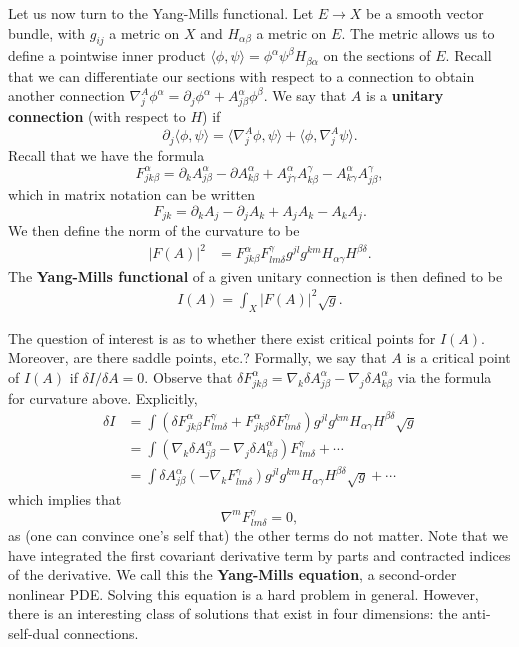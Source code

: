 \documentclass{../mathnotes}
\begin{document}
Let us now turn to the Yang-Mills functional. Let $E\to X$ be a smooth vector bundle, with $g_{ij}$ a metric on $X$
and $H_{\alpha\beta}$ a metric on $E$. 
The metric allows us to define a pointwise inner product $\langle\phi,\psi\rangle=\phi^\alpha\psi^\beta H_{\beta\alpha}$
on the sections of $E$. Recall that we can differentiate our sections with respect to a connection to obtain another connection
$\nabla^A_j\phi^\alpha=\partial_j\phi^\alpha+A_{j\beta}^\alpha\phi^\beta$. We say that $A$ is a \textbf{unitary connection}
(with respect to $H$) if
\[\partial_j\langle\phi,\psi\rangle=\langle\nabla_j^A\phi,\psi\rangle+\langle\phi,\nabla^A_j\psi\rangle.\]
Recall that we have the formula
\[F_{jk\beta}^\alpha=\partial_k A^\alpha_{j\beta}-\partial A^\alpha_{k\beta}+A^\alpha_{j\gamma}A^\gamma_{k\beta}-A^\alpha_{k\gamma}A^\gamma_{j\beta},\]
which in matrix notation can be written
\[F_{jk}=\partial_kA_j-\partial_jA_k+A_jA_k-A_kA_j.\]
We then define the norm of the curvature to be
\begin{align*}
    |F(A)|^2&=F_{jk\beta}^\alpha F_{lm\delta}^\gamma g^{jl}g^{km}H_{\alpha\gamma}H^{\beta\delta}.
\end{align*}
The \textbf{Yang-Mills functional} of a given unitary connection is then defined to be
\begin{align*}
    I(A)=\int_X |F(A)|^2\sqrt{g}.
\end{align*}

The question of interest is as to whether there exist critical points for $I(A)$. Moreover, are
there saddle points, etc.? Formally, we say that $A$ is a critical point of $I(A)$ if $\delta I/\delta A=0$.
Observe that $\delta F_{jk\beta}^\alpha=\nabla_{k}\delta A^\alpha_{j\beta}-\nabla_j\delta A^{\alpha}_{k\beta}$
via the formula for curvature above.
Explicitly,
\begin{align*}
    \delta I&= \int\left( \delta F_{jk\beta}^\alpha F_{lm\delta}^{\gamma}+F_{jk\beta}^\alpha \delta F_{lm\delta}^\gamma \right)g^{jl}g^{km}H_{\alpha\gamma}H^{\beta\delta}\sqrt{g}\\
    &=\int (\nabla_k\delta A^\alpha_{j\beta}-\nabla_j\delta A^\alpha_{k\beta})F_{lm\delta}^\gamma+\cdots\\
    &=\int \delta A^\alpha_{j\beta}(-\nabla_k F_{lm\delta}^\gamma)g^{jl}g^{km}H_{\alpha\gamma}H^{\beta\delta}\sqrt{g}+\cdots
\end{align*}
which implies that
\[\nabla^m F_{lm\delta}^\gamma=0,\]
as (one can convince one's self that) the other terms do not matter.
Note that we have integrated the first covariant derivative term by parts and contracted indices of the derivative.
We call this the \textbf{Yang-Mills equation}, a second-order nonlinear PDE. Solving this equation is a hard problem
in general. However, there is an interesting class of solutions that exist in four dimensions: the anti-self-dual connections.
\end{document}
